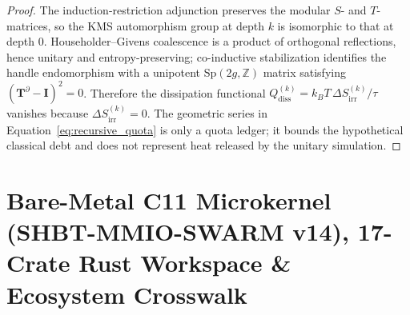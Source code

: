 \documentclass[11pt,onecolumn]{article}
\begin{document}
\begin{proof}
The induction-restriction adjunction preserves the modular $S$- and $T$-matrices, so the KMS automorphism group at depth $k$ is isomorphic to that at depth $0$. Householder--Givens coalescence is a product of orthogonal reflections, hence unitary and entropy-preserving; co-inductive stabilization identifies the handle endomorphism with a unipotent $\mathrm{Sp}(2g,\mathbb Z)$ matrix satisfying $(\mathbf T^\partial-\mathbf I)^2=0$. Therefore the dissipation functional $Q_{\text{diss}}^{(k)}=k_B T\,\Delta S_{\text{irr}}^{(k)}/\tau$ vanishes because $\Delta S_{\text{irr}}^{(k)}=0$. The geometric series in Equation~\eqref{eq:recursive_quota} is only a quota ledger; it bounds the hypothetical classical debt and does not represent heat released by the unitary simulation.
\end{proof}

\section{Bare-Metal C11 Microkernel (SHBT-MMIO-SWARM v14), 17-Crate Rust Workspace \& Ecosystem Crosswalk}
\label{sec:c11_microkernel_v11}
\end{document}

